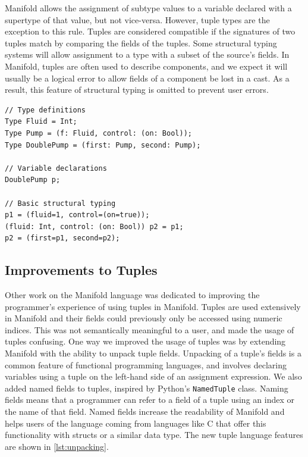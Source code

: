 Manifold allows the assignment of subtype values to a variable declared with a supertype of that value,
but not vice-versa.
However, tuple types are the exception to this rule. Tuples are
considered compatible if the signatures of two tuples
match by comparing the fields of the tuples.
Some structural typing systems will allow assignment to a type with a subset of the source's fields.
In Manifold, tuples are often used to describe components, and we expect it will usually be a logical error to allow
fields of a component be lost in a cast. As a result, this feature of structural typing is omitted to
prevent user errors.

\begin{lstlisting}[label=lst:types,caption=Example of types in a Manifold file]
// Type definitions
Type Fluid = Int;
Type Pump = (f: Fluid, control: (on: Bool));
Type DoublePump = (first: Pump, second: Pump);

// Variable declarations
DoublePump p;

// Basic structural typing
p1 = (fluid=1, control=(on=true));
(fluid: Int, control: (on: Bool)) p2 = p1;
p2 = (first=p1, second=p2);
\end{lstlisting}


\subsection{Improvements to Tuples}

Other work on the Manifold language was dedicated to improving the programmer's experience of using
tuples in Manifold. Tuples are used extensively in Manifold and their
fields could previously only be accessed using numeric indices. This was not
semantically meaningful to a user, and made the usage of tuples confusing. One way we improved the usage of tuples
was by extending
Manifold with the ability to unpack tuple fields. Unpacking of a tuple's
fields is a common feature of functional programming languages, and involves declaring
variables using a tuple on the left-hand side of an assignment expression. We
also added named fields to tuples, inspired by Python's \texttt{NamedTuple}
class. Naming fields means that a programmer can refer to a field of a tuple using an
index or the name of that field. Named fields increase the readability of
Manifold and helps users of the language coming from languages like C that offer this functionality
with structs or a similar data type. The new tuple language features are shown in \autoref{lst:unpacking}.

